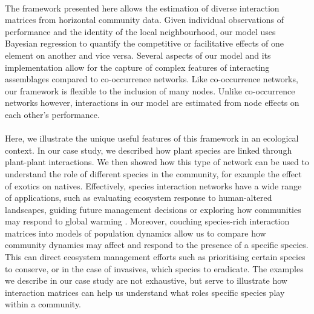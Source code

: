 \documentclass[a4,12pt]{article}
\begin{document}


    \paragraph{} 
    The framework presented here allows the estimation of diverse interaction matrices from horizontal community data. Given individual observations of performance and the identity of the local neighbourhood, our model uses Bayesian regression to quantify the competitive or facilitative effects of one element on another and vice versa. Several aspects of our model and its implementation allow for the capture of complex features of interacting assemblages compared to co-occurrence networks. Like co-occurrence networks, our framework is flexible to the inclusion of many nodes. Unlike co-occurrence networks however, interactions in our model are estimated from node effects on each other's performance.  


    \paragraph{}
    Here, we illustrate the unique useful features of this framework in an ecological context. In our case study, we described how plant species are linked through plant-plant interactions. We then showed how this type of network can be used to understand the role of different species in the community, for example the effect of exotics on natives. Effectively, species interaction networks have a wide range of applications, such as evaluating ecosystem response to human-altered landscapes, guiding future management decisions \parencite{Ross2011} or exploring how communities may respond to global warming \parencite{Gorman2019}. Moreover, couching species-rich interaction matrices into models of population dynamics allow us to compare how community dynamics may affect and respond to the presence of a specific species. This can direct ecosystem management efforts such as prioritising certain species to conserve, or in the case of invasives, which species to eradicate. The examples we describe in our case study are not exhaustive, but serve to illustrate how interaction matrices can help us understand what roles specific species play within a community. 
\end{document}
